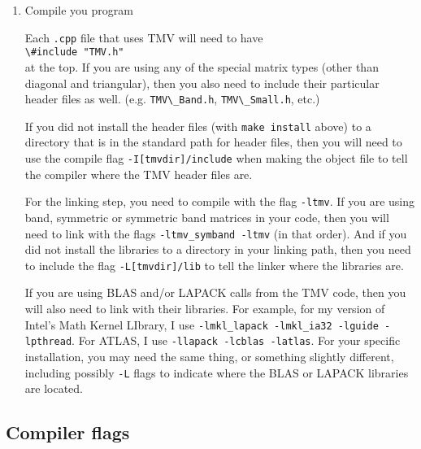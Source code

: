 \documentclass[twoside,letterpaper,11pt]{article}
\renewcommand{\tt}[1]{{\lstinline {#1}}}
\begin{document}
\begin{enumerate}
\item
Compile you program

Each \texttt{.cpp} file that uses TMV will need to have \\
\tt{\#include "TMV.h"}\\
at the top.
If you are using any of the special matrix types (other than diagonal and triangular),
then you also need to include their particular header files as well. (e.g.
\tt{TMV\_Band.h}, \tt{TMV\_Small.h}, etc.)

If you did not install the header files (with \texttt{make install} above) to 
a directory that is in the standard path for header files, then 
you will need to use the compile flag
\texttt{-I[tmvdir]/include} when making the object file to tell the 
compiler where the TMV header files are.

For the linking step, you need to compile with the flag
\texttt{-ltmv}.
If you are using band, symmetric or symmetric band matrices
in your code, then you will 
need to link with the flags \texttt{-ltmv\_symband -ltmv} (in that order).
And if you did not install the libraries to a directory in your linking path,
then you need to include the flag
\texttt{-L[tmvdir]/lib} to tell the linker where the libraries are.

If you are using BLAS and/or LAPACK calls from the TMV code,
then you will also need to 
link with their libraries.  
For example, for my version of Intel's Math Kernel LIbrary, I use 
\texttt{-lmkl\_lapack -lmkl\_ia32 -lguide -lpthread}.  
For ATLAS,
I use \texttt{-llapack -lcblas -latlas}.  For your specific installation, you may need 
the same thing, or something slightly different, including possibly
\texttt{-L} flags to indicate where the BLAS or LAPACK libraries are located.

\end{enumerate}

\subsection{Compiler flags}
\end{document}
